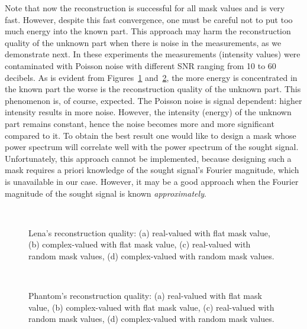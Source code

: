 Note that now the reconstruction is successful for all mask values and
is very fast. However, despite this fast convergence, one must be
careful not to put too much energy into the known part. This approach
may harm the reconstruction quality of the unknown part when there is
noise in the measurements, as we demonstrate next.  In these
experiments the measurements (intensity values) were contaminated with
Poisson noise with different SNR ranging from 10 to 60 decibels. As is
evident from Figures~\ref{fig:lena-reconstruction-quality}
and~\ref{fig:phantom-reconstruction-quality}, the more energy is
concentrated in the known part the worse is the reconstruction quality
of the unknown part. This phenomenon is, of course, expected. The
Poisson noise is signal dependent: higher intensity results in more
noise. However, the intensity (energy) of the unknown part remains
constant, hence the noise becomes more and more significant compared
to it. To obtain the best result one would like to design a mask whose
power spectrum will correlate well with the power spectrum of the
sought signal. Unfortunately, this approach cannot be implemented,
because designing such a mask requires a priori
knowledge of the sought signal's Fourier magnitude, which is
unavailable in our case. However, it may be a good approach when the
Fourier magnitude of the sought signal is known \emph{approximately}. 
\begin{figure}[H]
  \centering{}
  \quad{}
  \\
  \quad{}
  \caption[Lena's reconstruction quality]{Lena's reconstruction
    quality: (a) real-valued with flat mask value, (b) complex-valued
    with flat mask value, (c) real-valued with random mask values, (d)
    complex-valued with random mask values.}
  \label{fig:lena-reconstruction-quality}
\end{figure}
\begin{figure}[H]
  \centering{}
  \quad{}
  \\
  \quad{}
  \caption[Phantom's reconstruction quality]{Phantom's reconstruction
    quality: (a) real-valued with flat mask value, (b) complex-valued
    with flat mask value, (c) real-valued with random mask values, (d)
    complex-valued with random mask values.}
  \label{fig:phantom-reconstruction-quality}
\end{figure}
